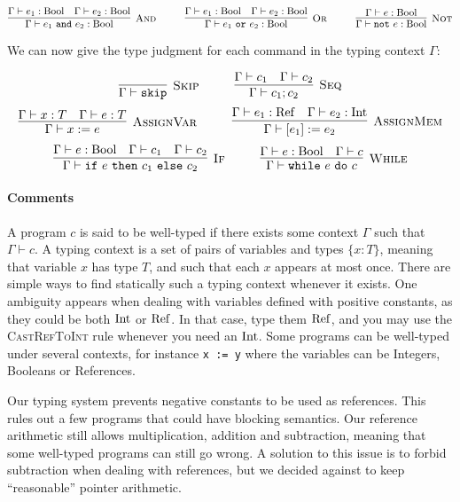 \[
\Rule{And}{\Gamma \vdash e_1~\texttt{and}~e_2: \Bool}{\Gamma \vdash e_1: \Bool \quad \Gamma \vdash e_2: \Bool}
\hspace*{1cm}
\Rule{Or}{\Gamma \vdash e_1~\texttt{or}~e_2: \Bool}{\Gamma \vdash e_1: \Bool \quad \Gamma \vdash e_2: \Bool}
\hspace*{1cm}
\Rule{Not}{\Gamma \vdash \texttt{not}~e: \Bool}{\Gamma \vdash e: \Bool}
\]

We can now give the type judgment for each command in the typing context $\Gamma$:

\[
	\Rule{Skip}{\Gamma \vdash \texttt{skip}}{} \hspace*{1cm}
	\Rule{Seq}{\Gamma \vdash c_1 ; c_2}{\Gamma \vdash c_1 \quad \Gamma \vdash c_2}
\]
\[
	\Rule{AssignVar}{\Gamma \vdash x := e}{\Gamma \vdash x: T \quad \Gamma \vdash e: T} \hspace*{1cm}
	\Rule{AssignMem}{\Gamma \vdash [e_1] := e_2}{\Gamma \vdash e_1: \Ref \quad \Gamma \vdash e_2: \Int}
\]
\[
	\Rule{If}{\Gamma \vdash \texttt{if}~e~\texttt{then}~c_1~\texttt{else}~c_2}{\Gamma \vdash e: \Bool \quad \Gamma \vdash c_1 \quad \Gamma \vdash c_2}
\hspace*{1cm}
	\Rule{While}{\Gamma \vdash \texttt{while}~e~\texttt{do}~c}{\Gamma \vdash e: \Bool \quad \Gamma \vdash c} 
\]


\paragraph{Comments}

A program $c$ is said to be well-typed if there exists some context $\Gamma$ such that $\Gamma\vdash c$.
A typing context is a set of pairs of variables and types $\{x:T\}$, meaning that variable $x$ has type $T$, and such that each $x$ appears at most once.
There are simple ways to find statically such a typing context whenever it exists. One ambiguity appears when dealing with variables defined with positive constants, as they could be both $\mathrm{Int}$ or $\mathrm{Ref}$. In that case, type them $\mathrm{Ref}$, and you may use the \textsc{CastRefToInt} rule whenever you need an $\mathrm{Int}$.
Some programs can be well-typed under several contexts, for instance \texttt{x := y} where the variables can be Integers, Booleans or References.

Our typing system prevents negative constants to be used as references.
This rules out a few programs that could have blocking semantics.
Our reference arithmetic still allows multiplication, addition and subtraction, meaning that some well-typed programs can still go wrong.
A solution to this issue is to forbid subtraction when dealing with references, but we decided against to keep ``reasonable'' pointer arithmetic.

